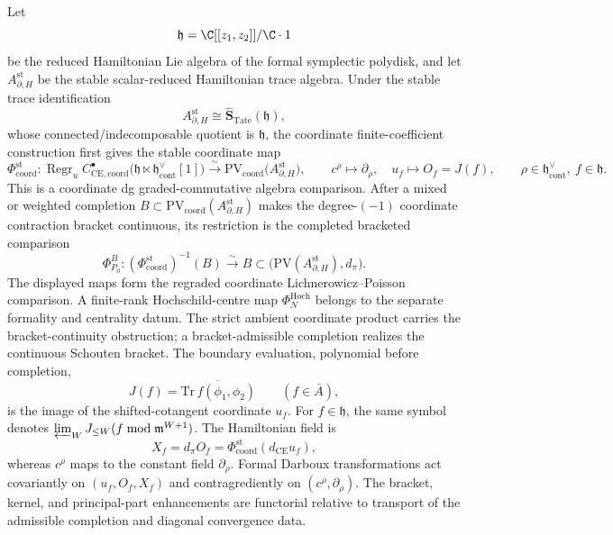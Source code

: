 \documentclass[11pt]{memoir}
\begin{document}
\begin{thm}
  \label{thm:coordinate-free-closed-open-synthesis}
  Let
  \[
    \mathfrak h=\C[[z_1,z_2]]/\C\cdot1
  \]
  be the reduced Hamiltonian Lie algebra of the formal symplectic polydisk, and
  let \(A_{\partial,H}^{\mathrm{st}}\) be the stable scalar-reduced
  Hamiltonian trace algebra. Under the stable trace identification
  \[
    A_{\partial,H}^{\mathrm{st}}
      \cong \widehat{\mathbf S}_{\mathrm{Tate}}(\mathfrak h),
  \]
  whose connected/indecomposable quotient is \(\mathfrak h\), the
  coordinate finite-coefficient construction first gives the stable
  coordinate map
  \[
    \Phi_{\mathrm{coord}}^{\mathrm{st}}\colon
    \operatorname{Regr}_u C^\bullet_{\mathrm{CE},\mathrm{coord}}
    \bigl(\mathfrak h\ltimes\mathfrak h^\vee_{\mathrm{cont}}[1]\bigr)
      \xrightarrow{\sim}
    \mathrm{PV}_{\mathrm{coord}}
    \bigl(A_{\partial,H}^{\mathrm{st}}\bigr),
    \qquad
    c^\rho\mapsto\partial_\rho,\quad u_f\mapsto O_f=J(f),
    \qquad \rho\in\mathfrak h^\vee_{\mathrm{cont}},\ f\in\mathfrak h.
  \]
  This is a coordinate dg graded-commutative algebra comparison.  After a
  mixed or weighted completion \(B\subset
  \mathrm{PV}_{\mathrm{coord}}(A_{\partial,H}^{\mathrm{st}})\) makes the
  degree-\((-1)\) coordinate contraction bracket continuous, its
  restriction is the completed bracketed comparison
  \[
    \Phi^B_{P_0}\colon
    (\Phi_{\mathrm{coord}}^{\mathrm{st}})^{-1}(B)
    \xrightarrow{\sim}B
    \subset
    \bigl(\mathrm{PV}(A_{\partial,H}^{\mathrm{st}}),d_\pi\bigr).
  \]
  The displayed maps form the regraded coordinate
  Lichnerowicz--Poisson comparison.  A finite-rank Hochschild-centre map
  \(\Phi_N^{\mathrm{Hoch}}\) belongs to the separate formality and
  centrality datum.  The strict ambient coordinate product carries the
  bracket-continuity obstruction; a bracket-admissible completion
  realizes the continuous Schouten bracket.
  The boundary evaluation, polynomial before completion,
  \[
    J(f)=\overline{\mathrm{Tr}\,f(\phi_1,\phi_2)}
    \qquad(f\in\bar A),
  \]
  is the image of the shifted-cotangent coordinate \(u_f\).  For
  \(f\in\mathfrak h\), the same symbol denotes
  \(\varprojlim_WJ_{\leq W}(f\bmod\mathfrak m^{W+1})\).  The
  Hamiltonian field is
  \[
    X_f=d_\pi O_f=\Phi_{\mathrm{coord}}^{\mathrm{st}}
      (d_{\mathrm{CE}}u_f),
  \]
  whereas \(c^\rho\) maps to the constant field \(\partial_\rho\).
  Formal Darboux transformations act covariantly on
  \((u_f,O_f,X_f)\) and contragrediently on
  \((c^\rho,\partial_\rho)\).  The bracket,
  kernel, and principal-part enhancements are functorial relative to
  transport of the admissible completion and diagonal convergence data.


\end{thm}
\end{document}
